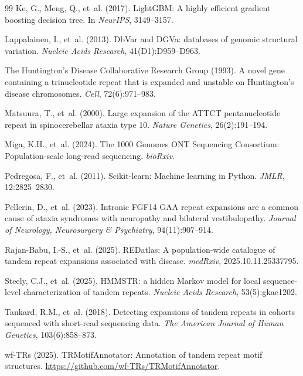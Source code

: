 \documentclass[11pt,twocolumn]{article}
\begin{document}
\begin{thebibliography}{99}
Ke, G., Meng, Q., et~al. (2017).
LightGBM: A highly efficient gradient boosting decision tree.
In \emph{NeurIPS}, 3149--3157.

Lappalainen, I., et~al. (2013).
DbVar and DGVa: databases of genomic structural variation.
\emph{Nucleic Acids Research}, 41(D1):D959--D963.

The Huntington's Disease Collaborative Research Group (1993).
A novel gene containing a trinucleotide repeat that is expanded and
unstable on Huntington's disease chromosomes.
\emph{Cell}, 72(6):971--983.

Matsuura, T., et~al. (2000).
Large expansion of the ATTCT pentanucleotide repeat in spinocerebellar
ataxia type 10.
\emph{Nature Genetics}, 26(2):191--194.

Miga, K.H., et~al. (2024).
The 1000 Genomes ONT Sequencing Consortium: Population-scale long-read
sequencing.
\emph{bioRxiv}.

Pedregosa, F., et~al. (2011).
Scikit-learn: Machine learning in Python.
\emph{JMLR}, 12:2825--2830.

Pellerin, D., et~al. (2023).
Intronic FGF14 GAA repeat expansions are a common cause of ataxia
syndromes with neuropathy and bilateral vestibulopathy.
\emph{Journal of Neurology, Neurosurgery \& Psychiatry}, 94(11):907--914.

Rajan-Babu, I.-S., et~al. (2025).
REDatlas: A population-wide catalogue of tandem repeat expansions
associated with disease.
\emph{medRxiv}, 2025.10.11.25337795.

Steely, C.J., et~al. (2025).
HMMSTR: a hidden Markov model for local sequence-level characterization
of tandem repeats.
\emph{Nucleic Acids Research}, 53(5):gkae1202.

Tankard, R.M., et~al. (2018).
Detecting expansions of tandem repeats in cohorts sequenced with
short-read sequencing data.
\emph{The American Journal of Human Genetics}, 103(6):858--873.

wf-TRs (2025).
TRMotifAnnotator: Annotation of tandem repeat motif structures.
\url{https://github.com/wf-TRs/TRMotifAnnotator}.

\end{thebibliography}
\end{document}
